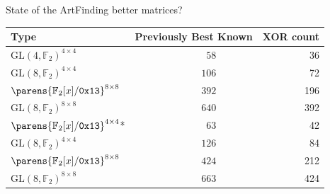 \begin{frame}{State of the Art}{Finding better matrices?}
    \centering
    \begin{tabular}{lrlr}
        \toprule
        Type                                                    & \multicolumn{2}{c}{Previously Best Known} &  XOR count \\
        \midrule
        ${\mathrm{GL}(4, \mathbb{F}_2)}^{4 \times 4}$           &  $58$ & \cite{ToSC:SarSye16,EPRINT:JeaPeySim17} &  36  \\ \rowcolor{gray!10}
        ${\mathrm{GL}(8, \mathbb{F}_2)}^{4 \times 4}$           & $106$ & \cite{FSE:LiWan16}                &        72  \\
        $\parens{\mathbb{F}_2[x]/\mathtt{0x 13}}^{8 \times 8}$  & $392$ & \cite{FSE:SKOP15}                 &       196  \\ \rowcolor{gray!10}
        ${\mathrm{GL}(8, \mathbb{F}_2)}^{8 \times 8}$           & $640$ & \cite{FSE:LiuSim16}               &       392  \\
        \midrule
        $\parens{\mathbb{F}_2[x]/\mathtt{0x 13}}^{4 \times 4}$* &  $63$ & \cite{EPRINT:JeaPeySim17}         &        42  \\ \rowcolor{gray!10}
        ${\mathrm{GL}(8, \mathbb{F}_2)}^{4 \times 4}$           & $126$ & \cite{EPRINT:JeaPeySim17}         &        84  \\
        $\parens{\mathbb{F}_2[x]/\mathtt{0x 13}}^{8 \times 8}$  & $424$ & \cite{FSE:SKOP15}                 &       212  \\ \rowcolor{gray!10}
        ${\mathrm{GL}(8, \mathbb{F}_2)}^{8 \times 8}$           & $663$ & \cite{EPRINT:JeaPeySim17}         &       424  \\
        \bottomrule
    \end{tabular}
\end{frame}
